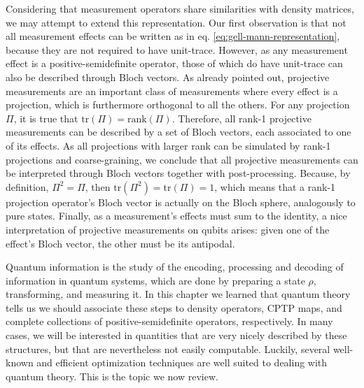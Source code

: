 		Considering that measurement operators share similarities with density matrices, we may attempt to extend this representation. Our first observation is that not all measurement effects can be written as in eq. \ref{eq:gell-mann-representation}, because they are not required to have unit-trace. However, as any measurement effect is a positive-semidefinite operator, those of which do have unit-trace can also be described through Bloch vectors. As already pointed out, projective measurements are an important class of measurements where every effect is a projection, which is furthermore orthogonal to all the others. For any projection $\Pi$, it is true that $\text{tr}(\Pi) = \text{rank}(\Pi)$. Therefore, all rank-1 projective measurements can be described by a set of Bloch vectors, each associated to one of its effects. As all projections with larger rank can be simulated by rank-1 projections and coarse-graining, we conclude that all projective measurements can be interpreted through Bloch vectors together with post-processing. Because, by definition, $\Pi^2 = \Pi$, then $\text{tr}(\Pi^2) = \text{tr}(\Pi) = 1$, which means that a rank-1 projection operator's Bloch vector is actually on the Bloch sphere, analogously to pure states. Finally, as a measurement's effects must sum to the identity, a nice interpretation of projective measurements on qubits arises: given one of the effect's Bloch vector, the other must be its antipodal.


		\ornamentbreak
		Quantum information is the study of the encoding, processing and decoding of information in quantum systems, which are done by preparing a state $\rho$, transforming, and measuring it. In this chapter we learned that quantum theory tells us we should associate these steps to density operators, CPTP maps, and complete collections of positive-semidefinite operators, respectively. In many cases, we will be interested in quantities that are very nicely described by these structures, but that are nevertheless not easily computable. Luckily, several well-known and efficient optimization techniques are well suited to dealing with quantum theory. This is the topic we now review.
